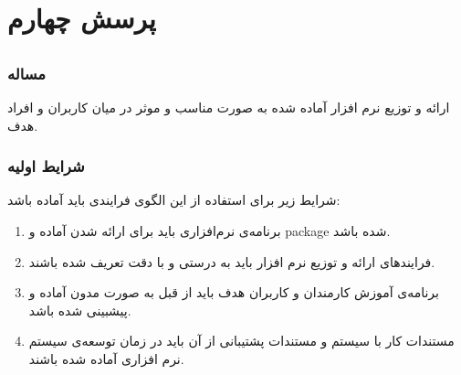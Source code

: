 
\section{پرسش چهارم}
\subsection{}
\subsubsection{مساله}
ارائه و توزیع نرم افزار آماده شده به صورت مناسب و موثر در میان کاربران و افراد هدف.
\subsubsection{شرایط اولیه}
شرایط زیر برای استفاده از این الگوی فرایندی باید آماده باشد:
\begin{enumerate}
\item 
برنامه‌ی نرم‌افزاری باید برای ارائه‌ شدن آماده و package شده باشد.
\item
فرایند‌های ارائه و توزیع نرم افزار باید به درستی و با دقت تعریف شده باشند.
\item
برنامه‌ی آموزش کارمندان و کاربران هدف باید از قبل به صورت مدون آماده و پیشبینی شده باشد.
\item
مستندات کار با سیستم و مستندات پشتیبانی از آن باید در زمان توسعه‌ی سیستم نرم افزاری آماده شده باشند.
\end{enumerate}
